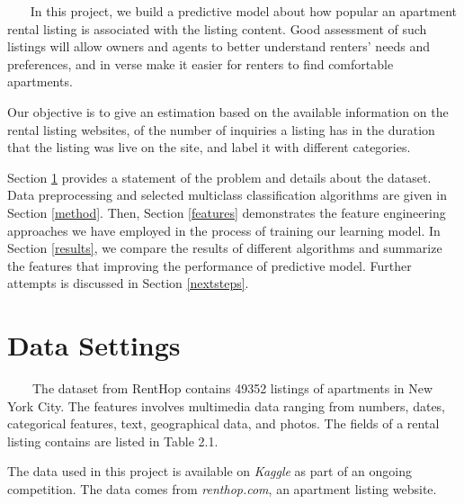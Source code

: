 \documentclass{article}
\begin{document}
~~~ In this project, we build a predictive model about how popular an apartment rental listing is associated with the listing content. Good assessment of such listings will allow owners and agents to better understand renters' needs and preferences, and in verse make it easier for renters to find comfortable apartments.

Our objective is to give an estimation based on the available information on the rental listing websites, of the number of inquiries a listing has in the duration that the listing was live on the site, and label it with different categories.

Section \ref{setting} provides a statement of the problem and details about the dataset. Data preprocessing and selected multiclass classification algorithms are given in Section \ref{method}. Then, Section \ref{features} demonstrates the feature engineering approaches we have employed in the process of training our learning model. In Section \ref{results}, we compare the results of different algorithms and summarize the features that improving the performance of predictive model.  Further attempts is discussed in Section \ref{nextsteps}.


\section{Data Settings} \label{setting}

~~~~The dataset from RentHop contains 49352 listings of apartments in New York
City. The features involves multimedia data ranging from numbers, dates, categorical features, text, geographical data, and photos.
The fields of a rental listing contains are listed in Table 2.1. 

The data used in this project is available on \textit{Kaggle} as part of an ongoing competition. The data comes from \textit{renthop.com}, an apartment listing website.
\end{document}
